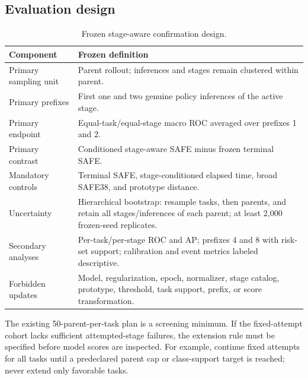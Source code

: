 
\subsection{Evaluation design}

\begin{table}[H]
\centering
\caption{Frozen stage-aware confirmation design.}
\label{tab:phase1-design}
\small
\begin{tabularx}{\textwidth}{P{0.26\textwidth}Y}
\toprule
Component & Frozen definition \\
\midrule
Primary sampling unit & Parent rollout; inferences and stages remain clustered within parent. \\
Primary prefixes & First one and two genuine policy inferences of the active stage. \\
Primary endpoint & Equal-task/equal-stage macro ROC averaged over prefixes 1 and 2. \\
Primary contrast & Conditioned stage-aware SAFE minus frozen terminal SAFE. \\
Mandatory controls & Terminal SAFE, stage-conditioned elapsed time, broad SAFE38, and prototype distance. \\
Uncertainty & Hierarchical bootstrap: resample tasks, then parents, and retain all stages/inferences of each parent; at least 2,000 frozen-seed replicates. \\
Secondary analyses & Per-task/per-stage ROC and AP; prefixes 4 and 8 with risk-set support; calibration and event metrics labeled descriptive. \\
Forbidden updates & Model, regularization, epoch, normalizer, stage catalog, prototype, threshold, task support, prefix, or score transformation. \\
\bottomrule
\end{tabularx}
\end{table}

The existing 50-parent-per-task plan is a screening minimum. If the fixed-attempt cohort lacks sufficient attempted-stage failures, the extension rule must be specified before model scores are inspected. For example, continue fixed attempts for all tasks until a predeclared parent cap or class-support target is reached; never extend only favorable tasks.

